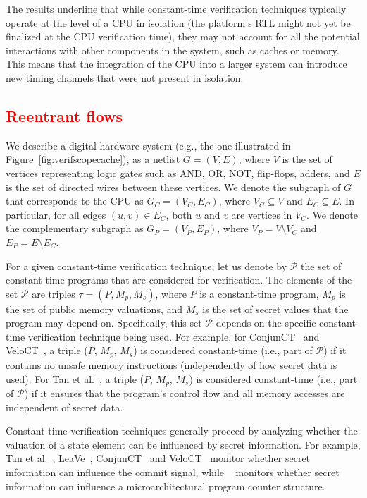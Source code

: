 The results underline that while constant-time verification techniques typically operate at the level of a CPU in isolation (the platform's RTL might not yet be finalized at the CPU verification time), they may not account for all the potential interactions with other components in the system, such as caches or memory.
This means that the integration of the CPU into a larger system can introduce new timing channels that were not present in isolation.

\subsection{\textcolor{red}{Reentrant flows}}

We describe a digital hardware system (e.g., the one illustrated in Figure~\ref{fig:verifscopecache}), as a netlist $G = (V, E)$, where $V$ is the set of vertices representing logic gates such as AND, OR, NOT, flip-flops, adders, and $E$ is the set of directed wires between these vertices.
We denote the subgraph of $G$ that corresponds to the CPU as $G_C = (V_C, E_C)$, where $V_C \subseteq V$ and $E_C \subseteq E$.
In particular, for all edges $(u, v) \in E_C$, both $u$ and $v$ are vertices in $V_C$.
We denote the complementary subgraph as $G_{P} = (V_{P}, E_{P})$, where $V_{P} = V \setminus V_C$ and $E_{P} = E \setminus E_C$.

For a given constant-time verification technique, let us denote by $\mathcal{P}$ the set of constant-time programs that are considered for verification.
The elements of the set $\mathcal{P}$ are triples $\tau = (P, M_p, M_s)$, where $P$ is a constant-time program, $M_p$ is the set of public memory valuations, and $M_s$ is the set of secret values that the program may depend on.
Specifically, this set $\mathcal{P}$ depends on the specific constant-time verification technique being used.
For example, for ConjunCT~\cite{dinesh2024conjunct} and VeloCT~\cite{dinesh2025h}, a triple ($P$, $M_p$, $M_s$) is considered constant-time (i.e., part of $\mathcal{P}$) if it contains no unsafe memory instructions (independently of how secret data is used).
For Tan et al.~\cite{tan2025contractshadowlogic}, a triple ($P$, $M_p$, $M_s$) is considered constant-time (i.e., part of $\mathcal{P}$) if it ensures that the program's control flow and all memory accesses are independent of secret data.

Constant-time verification techniques generally proceed by analyzing whether the valuation of a state element can be influenced by secret information.
For example, Tan et al.~\cite{tan2025contractshadowlogic}, LeaVe~\cite{wang2023specification}, ConjunCT~\cite{dinesh2024conjunct} and VeloCT~\cite{dinesh2025h} monitor whether secret information can influence the commit signal, while \ucfi~\cite{ceesay2024mucfi} monitors whether secret information can influence a microarchitectural program counter structure.

